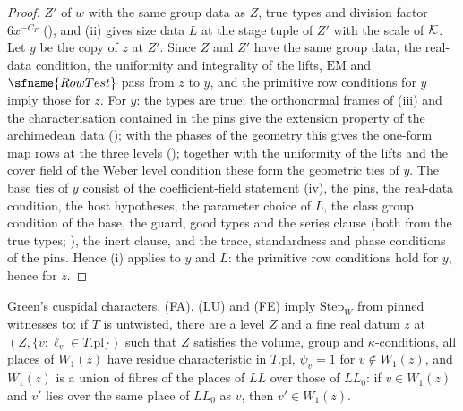 \begin{proof}
$Z'$ of $w$ with the same group data as $Z$, true types and division factor $6x^{-C_F}$ (), and
(ii) gives size data $L$ at
the stage tuple of $Z'$ with the scale of $\mathcal K$. Let $y$ be the copy of $z$ at $Z'$. Since $Z$ and $Z'$ have the same group data, the
real-data condition, the uniformity and integrality of the lifts, $\mathrm{EM}$ and $\sfname{RowTest}$ pass from $z$ to $y$, and the primitive
row conditions for $y$ imply those for $z$. For $y$: the types are true; the orthonormal frames of (iii) and the characterisation contained in
the pins give the extension property of the archimedean data ();
with the phases of the geometry this gives the one-form map rows at the three levels
(); together with the uniformity of the lifts and the cover field
of the Weber level condition these form the geometric ties of $y$. The base ties of $y$ consist of the coefficient-field statement (iv), the
pins, the real-data condition, the host hypotheses, the parameter choice of $L$, the class group condition of the base, the guard, good types and
the series clause (both from the true types; ), the inert clause, and the trace,
standardness and phase conditions of the pins. Hence (i) applies to $y$ and $L$: the primitive row conditions hold for $y$, hence for $z$.
\end{proof}

\begin{lemma}\label{pf:bundles:lem:sat}
Green's cuspidal characters, (FA), (LU) and (FE) imply $\mathrm{Step}_W$ from pinned witnesses to: if $T$ is untwisted, there are a level $Z$
and a fine real datum $z$ at $(Z,\{v:\ell_v\in T.\mathrm{pl}\})$ such that $Z$ satisfies the volume, group and $\kappa$-conditions, all places
of $W_1(z)$ have residue characteristic in $T.\mathrm{pl}$, $\psi_v=1$ for $v\notin W_1(z)$, and $W_1(z)$ is a union of fibres of the places of
$\mathit{LL}$ over those of $\mathit{LL}_0$: if $v\in W_1(z)$ and $v'$ lies over the same place of $\mathit{LL}_0$ as $v$, then $v'\in W_1(z)$.
\end{lemma}

